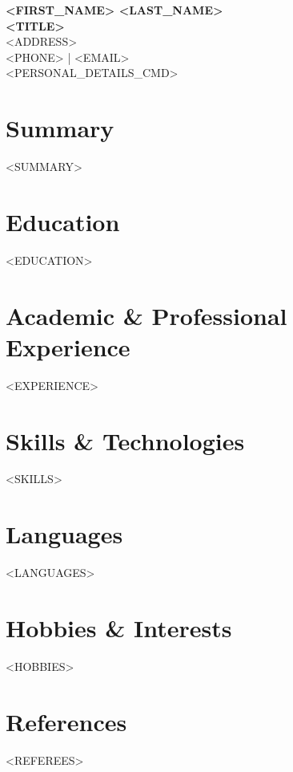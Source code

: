 \documentclass[11pt,a4paper]{article}
\begin{document}
\begin{center}
    {\LARGE \textbf{<FIRST_NAME> <LAST_NAME>}} \\ \vspace{2mm}
    {\normalsize \textbf{<TITLE>}} \\ \vspace{2mm}
    <ADDRESS> \\
    <PHONE> | <EMAIL> \\
    <PERSONAL_DETAILS_CMD>
\end{center}

\vspace{4mm}
\section*{Summary}
<SUMMARY>

\section*{Education}
<EDUCATION>

\section*{Academic \& Professional Experience}
<EXPERIENCE>

\section*{Skills \& Technologies}
<SKILLS>

\section*{Languages}
<LANGUAGES>

\section*{Hobbies \& Interests}
<HOBBIES>

\section*{References}
<REFEREES>
\end{document}
